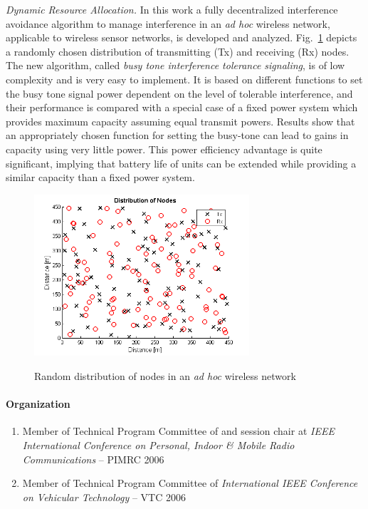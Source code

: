 \emph{Dynamic Resource Allocation.} In this work a fully
decentralized interference avoidance algorithm to manage
interference in an \emph{ad hoc} wireless network, applicable to
wireless sensor networks, is developed and analyzed. Fig.~\ref{dca}
depicts a randomly chosen distribution of transmitting (Tx) and
receiving (Rx) nodes. The new algorithm, called \emph{busy tone
interference tolerance signaling}, is of low complexity and is very
easy to implement. It is based on different functions to set the
busy tone signal power dependent on the level of tolerable
interference, and their performance is compared with a special case
of a fixed power system which provides maximum capacity assuming
equal transmit powers. Results show that an appropriately chosen
function for setting the busy-tone can lead to gains in capacity
using very little power. This power efficiency advantage is quite
significant, implying that battery life of units can be extended
while providing a similar capacity than a fixed power system.
\begin{figure}[!!htp]
 \centering
\includegraphics[width=8cm]{haas_3.png}\\
\caption{Random distribution of nodes in an \emph{ad hoc} wireless network}
\label{dca}
\end{figure}


\paragraph{Organization}
\begin{enumerate}
    \item Member of Technical Program Committee of and session chair
          at \emph{IEEE International Conference on Personal, Indoor \& Mobile Radio Communications} -- PIMRC 2006
    \item Member of Technical Program Committee of \emph{International IEEE Conference on Vehicular Technology} -- VTC 2006
\end{enumerate}

